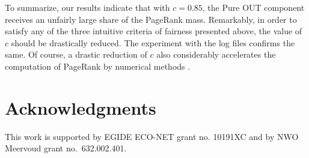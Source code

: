 \documentclass{article}
\begin{document}
To summarize, our results indicate that with $c=0.85$, the Pure OUT
component receives an unfairly large share of the PageRank mass.
Remarkably, in order to satisfy any of the three intuitive criteria
of fairness presented above, the value of $c$ should be drastically
reduced. The experiment with the log files confirms the same. Of
course, a drastic reduction of $c$ also considerably accelerates the
computation of PageRank by numerical methods
\cite{Avrachenkov07SIAM,LangvilleMeyer,Berkhin05}.


\section*{Acknowledgments}

This work is supported by EGIDE ECO-NET grant no. 10191XC and by NWO Meervoud grant no.~632.002.401.
\end{document}
